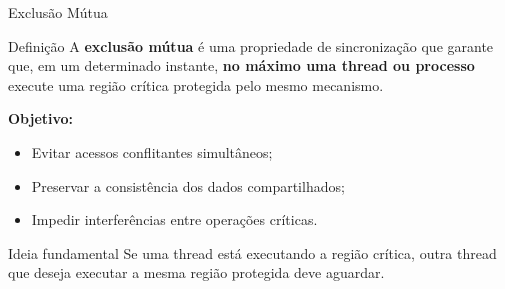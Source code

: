 \documentclass[aspectratio=169,11pt]{beamer}
\begin{document}
\begin{frame}{Exclusão Mútua}

\begin{block}{Definição}
A \textbf{exclusão mútua} é uma propriedade de sincronização
que garante que, em um determinado instante,
\textbf{no máximo uma thread ou processo}
execute uma região crítica protegida pelo mesmo mecanismo.
\end{block}

\vspace{0.4cm}

\textbf{Objetivo:}

\begin{itemize}
    \item Evitar acessos conflitantes simultâneos;
    \item Preservar a consistência dos dados compartilhados;
    \item Impedir interferências entre operações críticas.
\end{itemize}

\vspace{0.4cm}

\begin{alertblock}{Ideia fundamental}
Se uma thread está executando a região crítica,
outra thread que deseja executar a mesma região protegida
deve aguardar.
\end{alertblock}

\end{frame}


\end{document}
